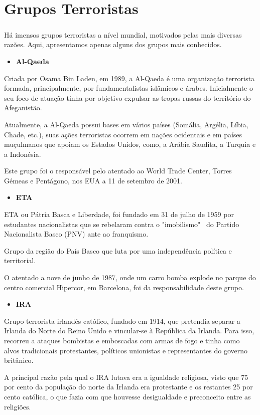 \documentclass{report}
\begin{document}
\chapter{Grupos Terroristas}
\label{chap.Grupos Terroristas}
\paragraph{} Há imensos grupos terroristas a nível mundial, motivados pelas mais diversas razões. Aqui, apresentamos apenas alguns dos grupos mais conhecidos.\par

\begin{itemize}
 \item \textbf{Al-Qaeda}
\end{itemize}
\par
Criada por Osama Bin Laden, em 1989, a Al-Qaeda  é uma organização terrorista formada, principalmente, por fundamentalistas islâmicos e árabes. Inicialmente o seu foco de atuação tinha por objetivo expulsar as tropas russas do território do Afeganistão.\par
Atualmente, a Al-Qaeda possui bases em vários países (Somália, Argélia, Líbia, Chade, etc.), suas ações terroristas ocorrem em nações ocidentais e em países muçulmanos que apoiam os Estados Unidos, como, a Arábia Saudita, a Turquia e a Indonésia.\par
Este grupo foi o responsável pelo atentado ao World Trade Center, Torres Gémeas e Pentágono, nos EUA a 11 de setembro de 2001.

\begin{itemize}
 \item \textbf{ETA}
\end{itemize}
\par
ETA ou Pátria Basca e Liberdade, foi fundado em 31 de julho de 1959 por estudantes nacionalistas que se rebelaram contra o "imobilismo" \, do Partido Nacionalista Basco (PNV) ante ao franquismo.\par
Grupo da região do País Basco que luta por uma independência política e territorial.\par
O atentado a nove de junho de 1987, onde um carro bomba explode no parque do centro  comercial Hipercor, em Barcelona, foi da responsabilidade deste grupo.

\begin{itemize}
 \item \textbf{IRA}
\end{itemize}
\par
Grupo terrorista irlandês católico, fundado em 1914, que pretendia separar a Irlanda do Norte do Reino Unido e vincular-se à República da Irlanda. Para isso, recorreu a  ataques bombistas e emboscadas com armas de fogo e tinha como alvos tradicionais protestantes, políticos unionistas e representantes do governo britânico.\par
A principal razão pela qual o IRA lutava era a igualdade religiosa, visto que 75 por cento da população do norte da Irlanda era protestante e os restantes 25 por cento  católica, o que fazia com que houvesse desigualdade e preconceito entre as religiões.
\end{document}
